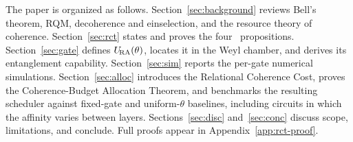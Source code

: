The paper is organized as follows.
Section~\ref{sec:background} reviews Bell's theorem, RQM, decoherence
and einselection, and the resource theory of coherence.
Section~\ref{sec:rct} states and proves the four \RCF~propositions.
Section~\ref{sec:gate} defines $U_{\!\mathrm{RA}}(\theta)$, locates it in the Weyl
chamber, and derives its entanglement capability.
Section~\ref{sec:sim} reports the per-gate numerical simulations.
Section~\ref{sec:alloc} introduces the Relational Coherence Cost,
proves the Coherence-Budget Allocation Theorem, and benchmarks the
resulting scheduler against fixed-gate and uniform-$\theta$ baselines, including circuits in which the affinity varies between layers.
Sections~\ref{sec:disc} and~\ref{sec:conc} discuss scope, limitations,
and conclude.
Full proofs appear in Appendix~\ref{app:rct-proof}.
